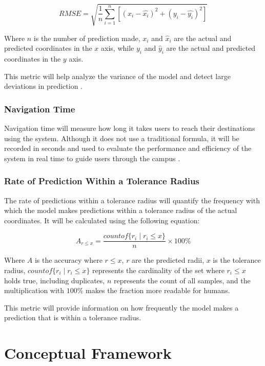 \begin{refsection}
\begin{equation}
RMSE = \sqrt{\frac{1}{n} \sum_{i=1}^{n} [(x_i - \hat{x_i})^2 + (y_i - \hat{y_i})^2]}
\label{eq:rmse}
\end{equation}

Where \(n\) is the number of prediction made, \(x_i\) and \(\hat{x}_i\) are the actual and predicted coordinates in the \(x\) axis, while \(y_i\) and \(\hat{y}_i\) are the actual and predicted coordinates in the \(y\) axis.

This metric will help analyze the variance of the model and detect large deviations in prediction \cite{gmd-15-5481-2022}.

\subsubsection{Navigation Time}

Navigation time will measure how long it takes users to reach their destinations using the system. Although it does not use a traditional formula, it will be recorded in seconds and used to evaluate the performance and efficiency of the system in real time to guide users through the campus \cite{one}.

\subsubsection{Rate of Prediction Within a Tolerance Radius}

The rate of predictions within a tolerance radius will quantify the frequency with which the model makes predictions within a tolerance radius of the actual coordinates. It will be calculated using the following equation:

\begin{equation}
A_{r \leq x} = \frac{countof\{r_i \mid r_i \leq x\}}{n} \times 100\%
\label{eq:acc}
\end{equation}

Where \(A\) is the accuracy where \(r \leq x\), \(r\) are the predicted radii, \(x\) is the tolerance radius, \(countof\{r_i \mid r_i \leq x\}\) represents the cardinality of the set where \(r_i \leq x\) holds true, including duplicates, \(n\) represents the count of all samples, and the multiplication with \(100\%\) makes the fraction more readable for humans.

This metric will provide information on how frequently the model makes a prediction that is within a tolerance radius.

\section{Conceptual Framework}


\end{refsection}
